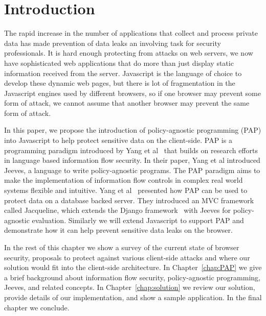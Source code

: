 \chapter{Introduction\label{chap:intro}}

The rapid increase in the number of applications that collect and process private
data has made prevention of data leaks an involving task for security professionals.
It is hard enough protecting from attacks on web servers, we now have sophisticated
web applications that do more than just display static information received from
the server. Javascript is the language of choice to develop these dynamic web pages,
but there is lot of fragmentation in the Javascript engines used by different browsers,
so if one browser may prevent some form of attack, we cannot assume that another
browser may prevent the same form of attack.

In this paper, we propose the introduction of policy-agnostic programming (PAP)
into Javascript to help protect sensitive data on the client-side. PAP is a
programming paradigm introduced by Yang et al~\cite{Jeeves} that builds on
research efforts in language based information flow security. In their paper,
Yang et al introduced Jeeves, a language to write policy-agnostic programs. The
PAP paradigm aims to make the implementation of information flow controls in complex
real world systems flexible and intuitive. Yang et al~\cite{Jacqueline} presented
how PAP can be used to protect data on a database backed server. They introduced
an MVC framework called Jacqueline, which extends the Django framework~\cite{django}
with Jeeves for policy-agnostic evaluation. Similarly we will extend Javascript
to support PAP and demonstrate how it can help prevent sensitive data leaks on the
browser.

In the rest of this chapter we show a survey of the current state of browser security,
proposals to protect against various client-side attacks and where our solution
would fit into the client-side architecture. In Chapter~\ref{chap:PAP} we give a brief background
about information flow security, policy-agnostic programming, Jeeves, and related
concepts. In Chapter~\ref{chap:solution} we review our solution, provide details
of our implementation, and show a sample application. In the final chapter we conclude.

